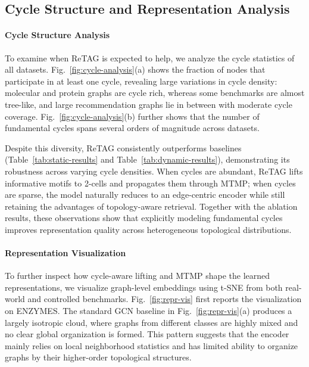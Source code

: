\subsection{Cycle Structure and Representation Analysis}
\paragraph{Cycle Structure Analysis}
To examine when ReTAG is expected to help, we analyze the cycle statistics
of all datasets. Fig.~\ref{fig:cycle-analysis}(a) shows the fraction of
nodes that participate in at least one cycle, revealing large variations
in cycle density: molecular and protein graphs are cycle rich, whereas
some benchmarks are almost tree-like, and large recommendation graphs lie
in between with moderate cycle coverage. 
Fig.~\ref{fig:cycle-analysis}(b) further shows that the number of
fundamental cycles spans several orders of magnitude across datasets.

Despite this diversity, ReTAG consistently outperforms baselines
(Table~\ref{tab:static-results} and Table~\ref{tab:dynamic-results}),
demonstrating its robustness across varying cycle densities. When cycles are
abundant, ReTAG lifts informative motifs to 2-cells and propagates them
through MTMP; when cycles are sparse, the model naturally reduces to an
edge-centric encoder while still retaining the advantages of topology-aware retrieval.
Together with the ablation results, these observations show that
explicitly modeling fundamental cycles improves representation quality
across heterogeneous topological distributions.

\paragraph{Representation Visualization}
To further inspect how cycle-aware lifting and MTMP shape the learned
representations, we visualize graph-level embeddings using t-SNE from both
real-world and controlled benchmarks. Fig.~\ref{fig:repr-vis} first reports
the visualization on ENZYMES. The standard GCN baseline in
Fig.~\ref{fig:repr-vis}(a) produces a largely isotropic cloud, where graphs
from different classes are highly mixed and no clear global organization is
formed. This pattern suggests that the encoder mainly relies on local
neighborhood statistics and has limited ability to organize graphs by their
higher-order topological structures.

